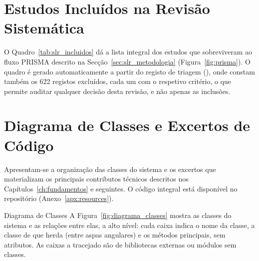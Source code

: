 \documentclass[12pt,reqno, twoside]{amsbook}
\makeatletter
\def\section{\@startsection{section}{1}%
      \z@{.5\linespacing\@plus.7\linespacing}{.25\linespacing}%
      {\normalfont\bfseries\flushleft}}
\theoremstyle{plain}
\numberwithin{equation}{chapter}
\numberwithin{section}{chapter}
\numberwithin{table}{chapter}
\numberwithin{figure}{chapter}
\makeatother
\begin{document}
\chapter{Estudos Incluídos na Revisão Sistemática}
\label{apx:slr}
O Quadro~\ref{tab:slr_incluidos} dá a lista integral dos estudos que
sobreviveram ao fluxo PRISMA descrito na
Secção~\ref{sec:slr_metodologia} (Figura~\ref{fig:prisma}). O quadro é gerado
automaticamente a partir do registo de triagem (), onde
constam também os 622 registos excluídos, cada um com o respetivo critério, o que
permite auditar qualquer decisão desta revisão, e não apenas as inclusões.



\chapter{Diagrama de Classes e Excertos de Código}
\label{apx:code}
Apresentam-se a organização das classes do sistema e os excertos que materializam os principais contributos técnicos descritos nos Capítulos~\ref{ch:fundamentos} e seguintes. O código integral está disponível no repositório (Anexo~\ref{apx:resources}).

\section{Diagrama de Classes}
A Figura~\ref{fig:diagrama_classes} mostra as classes do sistema e as relações entre elas, a alto nível: cada caixa indica o nome da classe, a classe de que herda (entre aspas angulares) e os métodos principais, sem atributos. As caixas a tracejado são de bibliotecas externas ou módulos sem classes.
\end{document}
